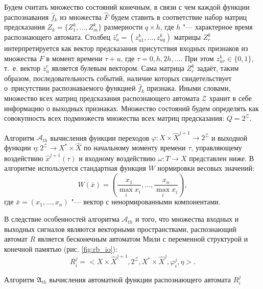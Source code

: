 \documentclass[a4paper, 12pt]{article}
\theoremstyle{plain}
\begin{document}
	Будем считать множество состояний конечным, в связи с чем каждой функции распознавания $\hat f_k$ из множества $\hat F$ будем ставить в соответствие набор матриц предсказания $Z_k=\{Z_1^k,…,Z_m^k\}$ размерности $q\times h$, где $h$ "--- характерное время распознающего автомата. Столбец $\bar{z}_u^r=(z_{u1}^k,…,z_{uq}^k)$ матрицы $Z_r^k$ интерпретируется как вектор предсказания присутствия входных признаков из множества $F$ в момент времени $\tau+u$, где $\tau = 0,h,2h,\dots$. При этом $z_{uv}^k\in\{0,1\}$, т.~е. вектор $\bar{z}_u^r$ является булевым вектором. Сама матрица $Z_r^k$ задаёт, таким образом, последовательность событий, наличие которых свидетельствует о~присутствии распознаваемого функцией $\hat f_k$ признака. Иными словами, множество всех матриц предсказания распознающего автомата $\mathcal Z$ хранит в себе информацию о выходных признаках. Множество состояний будем определять как совокупность всех подмножеств множества всех матриц предсказания: $Q=2^{\mathcal Z}$.
	
	Алгоритм $\mathcal A_{th}$ вычисления функции переходов $\varphi:X\times\hat X^{j+1}\to 2^{\mathcal Z}$ и выходной функции $\eta:2^{\mathcal Z}\to X^*\times\hat X$ по начальному моменту времени $\tau$, управляющему воздействию $\hat x^{j+1}(\tau)$ и входному воздействию $\omega:T\to X$ представлен ниже. В алгоритме используется стандартная функция $W$ нормировки весовых значений:
	\begin{equation}
	W(\bar x)=\left(\frac{x_1}{\max\limits_i x_i},\dots,\frac{x_n}{\max\limits_i x_i}\right),
	\end{equation} 
	где $\bar x=(x_1,\dots,x_n)$ "--- вектор с ненормированными компонентами.
	
	В следствие особенностей алгоритма $\mathcal A_{th}$ и  того, что множества входных и выходных сигналов являются векторными пространствами, распознающий автомат $R$ является бесконечным автоматом Мили с переменной структурой и конечной памятью (рис. \ref{fig:rb_io}): 
	\begin{equation}
	R_i^j=<X\times\hat X^{j+1}, 2^{\mathcal Z}, X^*\times\hat X^j,\varphi_i^j,\eta>.
	\end{equation}

	\begin{algorithm}
		\caption{Алгоритм $\mathfrak{A}_{th}$ вычисления автоматной функции распознающего автомата $R_i^j$}\label{alg:automato}
		\begin{algorithmic}[1]
			
			
		\end{algorithmic}
	\end{algorithm}
	
\end{document}
